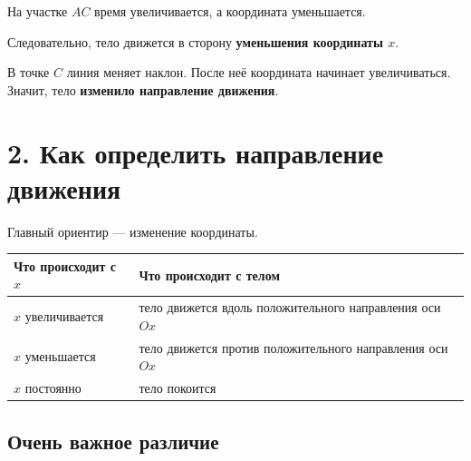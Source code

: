 \documentclass[a4paper,12pt]{article}
\newcommand{\important}[1]{\textbf{\color{accent}#1}}
\begin{document}
\begin{center}
\end{center}

На участке \(AC\) время увеличивается, а координата уменьшается.

Следовательно, тело движется в сторону \important{уменьшения координаты \(x\)}.

В точке \(C\) линия меняет наклон. После неё координата начинает
увеличиваться. Значит, тело \important{изменило направление движения}.

\section{2. Как определить направление движения}

Главный ориентир --- изменение координаты.

\begin{center}
\begin{tabularx}{0.92\linewidth}{@{}X X@{}}
\toprule
\textbf{Что происходит с \(x\)} &
\textbf{Что происходит с телом} \\
\midrule
\(x\) увеличивается &
тело движется вдоль положительного направления оси \(Ox\) \\
\(x\) уменьшается &
тело движется против положительного направления оси \(Ox\) \\
\(x\) постоянно &
тело покоится \\
\bottomrule
\end{tabularx}
\end{center}

\subsection{Очень важное различие}
\end{document}
